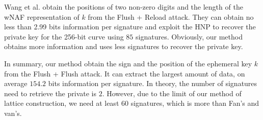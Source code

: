 Wang et al. \cite{Wang2017} obtain the positions of two non-zero digits and the length of the wNAF representation of $k$ from the Flush + Reload attack.
They can obtain no less than 2.99 bits information per signature and exploit the HNP to recover the private key for the 256-bit curve using $85$ signatures.
Obviously, our method obtains more information and uses less signatures to recover the private key.

In summary, our method obtain the sign and the position of the ephemeral key $k$ from the Flush + Flush attack.
It can extract the largest amount of data, on average $154.2$ bits information per signature.
In theory, the number of signatures need to retrieve the private is $2$.
  However, due to the limit of our method of lattice construction, we need at least $60$ signatures, which is more than Fan's and van's.






























